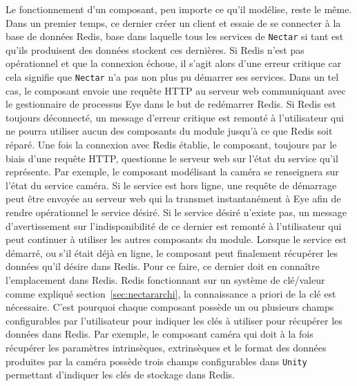 Le fonctionnement d'un composant, peu importe ce qu'il modélise, reste le même. Dans un premier temps, ce dernier créer un client et essaie de se connecter à la base de données Redis, base dans laquelle tous les services de \texttt{Nectar} si tant est qu'ils produisent des données stockent ces dernières. Si Redis n'est pas opérationnel et que la connexion échoue, il s'agit alors d'une erreur critique car cela signifie que \texttt{Nectar} n'a pas non plus pu démarrer ses services. Dans un tel cas, le composant envoie une requête HTTP au serveur web communiquant avec le gestionnaire de processus Eye dans le but de redémarrer Redis. Si Redis est toujours déconnecté, un message d'erreur critique est remonté à l'utilisateur qui ne pourra utiliser aucun des composants du module jusqu'à ce que Redis soit réparé. 
Une fois la connexion avec Redis établie, le composant, toujours par le biais d'une requête HTTP, questionne le serveur web sur l'état du service qu'il représente. Par exemple, le composant modélisant la caméra se renseignera sur l'état du service caméra. Si le service est hors ligne, une requête de démarrage peut être envoyée au serveur web qui la transmet instantanément à Eye afin de rendre opérationnel le service désiré. Si le service désiré n'existe pas, un message d'avertissement sur l'indisponibilité de ce dernier est remonté à l'utilisateur qui peut continuer à utiliser les autres composants du module.
Lorsque le service est démarré, ou s'il était déjà en ligne, le composant peut finalement récupérer les données qu'il désire dans Redis. Pour ce faire, ce dernier doit en connaître l'emplacement dans Redis. Redis fonctionnant sur un système de clé/valeur comme expliqué section~\ref{sec:nectararchi}, la connaissance a priori de la clé est nécessaire. C'est pourquoi chaque composant possède un ou plusieurs champs configurables par l'utilisateur pour indiquer les clés à utiliser pour récupérer les données dans Redis. Par exemple, le composant caméra qui doit à la fois récupérer les paramètres intrinsèques, extrinsèques et le format des données produites par la caméra possède trois champs configurables dans \texttt{Unity} permettant d'indiquer les clés de stockage dans Redis.

